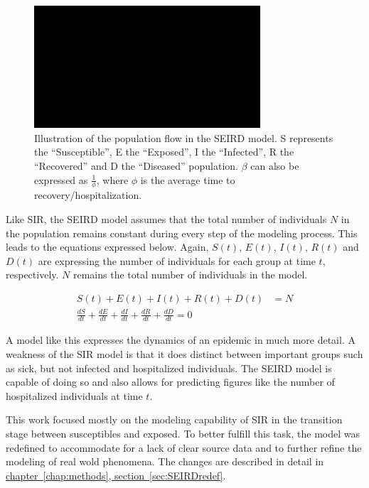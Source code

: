 \begin{figure}
	\begin{center}
		\includegraphics[width=0.75\textwidth]{./figures/SEIRD.png}
		\caption{Illustration of the population flow in the SEIRD model. S represents the ``Susceptible'', E the ``Exposed'',
			I the ``Infected'', R the ``Recovered'' and D the ``Diseased'' population. $\beta$ can also be expressed as
			$\frac{1}{\phi}$, where $\phi$ is the average time to recovery/hospitalization.}
		\label{fig:SEIRD}
	\end{center}
\end{figure}


\par
Like SIR, the SEIRD model assumes that the total number of individuals $N$ in the population remains constant during every step
of the modeling process. This leads to the equations expressed below. Again, $S(t)$, $E(t)$, $I(t)$, $R(t)$ and $D(t)$ are
expressing the number of individuals for each group at time $t$, respectively. $N$ remains the total number of individuals in the model.

\begin{align}
	\label{eq:SEIRD2}
	S(t) + E(t) + I(t) + R(t) + D(t) &= N \\
	\frac{dS}{dt} + \frac{dE}{dt}  + \frac{dI}{dt} + \frac{dR}{dt} + \frac{dD}{dt} = 0
\end{align}

\par
A model like this expresses the dynamics of an epidemic in much more detail. A weakness of the SIR model is that it does distinct between important
groups such as sick, but not infected and hospitalized individuals. The SEIRD model is capable of doing so and also allows for predicting
figures like the number of hospitalized individuals at time $t$.\newline

\par
This work focused mostly on the modeling capability of SIR in the transition stage between susceptibles and exposed. To better fulfill this
task, the model was redefined to accommodate for a lack of clear source data and to further refine the modeling of real wold phenomena. The changes
are described in detail in \hyperref[sec:SEIRDredef]{chapter~\ref*{chap:methods}, section~\ref*{sec:SEIRDredef}}.



